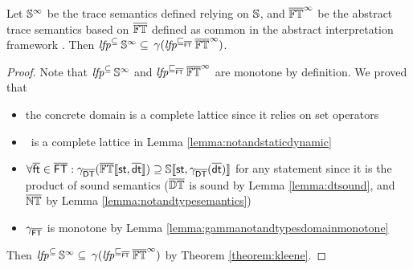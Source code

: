 \documentclass{llncs}
\begin{document}
\begin{theorem}[Soundness]
\label{theorem:soundness}
Let $\mathit{\mathbb{S}}^{\infty}$ be the trace semantics defined relying on $\mathit{\mathbb{S}}$, and $\overline{\mathit{\mathbb{FT}}}^{\infty}$ be the abstract trace semantics based on $\overline{\mathit{\mathbb{FT}}}$ defined as common in the abstract interpretation framework \cite{CC77}. Then $\mathit{lfp}^{\mathit{\subseteq}}_{} \hspace{2pt} \mathit{\mathbb{S}}^{\infty} \subseteq \hspace{2pt} \gamma(\mathit{lfp}^{\sqsubseteq_{\mathsf{\overline{FT}}}}_{} \hspace{2pt} \overline{\mathit{\mathbb{FT}}}^{\infty})$.
\begin{proof}
Note that $\mathit{lfp}^{\mathit{\subseteq}}_{} \hspace{2pt} \mathit{\mathbb{S}}^{\infty}$ and $\mathit{lfp}^{\sqsubseteq_{\mathsf{\overline{FT}}}}_{} \hspace{2pt} \overline{\mathit{\mathbb{FT}}}^{\infty}$ are monotone by definition. We proved that 
\begin{itemize}
\item the concrete domain is a complete lattice since it relies on set operators
\item \notandtypesdomain\ is a complete lattice in Lemma \ref{lemma:notandstaticdynamic}
\item $\forall \mathsf{\overline{ft}} \in \mathsf{\overline{FT}} : \gamma_{\mathsf{\overline{DT}}} (\mathbb{\overline{\mathit{\mathbb{FT}}}}\llbracket \mathtt{\mathsf{st}, \mathsf{\overline{dt}}} \rrbracket) \supseteq \mathbb{S}\llbracket \mathtt{\mathsf{st}, \gamma_{\mathsf{\overline{DT}}}(\mathsf{\overline{dt}})} \rrbracket$ for any statement  since it is the product of sound semantics ($\overline{\mathit{\mathbb{DT}}}$ is sound by Lemma \ref{lemma:dtsound}, and $\overline{\mathit{\mathbb{NT}}}$ by Lemma \ref{lemma:notandtypesemantics})
\item $\gamma_{\mathsf{\overline{FT}}}$ is monotone by Lemma \ref{lemma:gammanotandtypesdomainmonotone}
\end{itemize}
Then $\mathit{lfp}^{\mathit{\subseteq}}_{} \hspace{2pt} \mathit{\mathbb{S}}^{\infty} \subseteq \hspace{2pt} \gamma(\mathit{lfp}^{\sqsubseteq_{\mathsf{\overline{FT}}}}_{} \hspace{2pt} \overline{\mathit{\mathbb{FT}}}^{\infty})$ by Theorem \ref{theorem:kleene}.
\end{proof}
\end{theorem}
\end{document}
